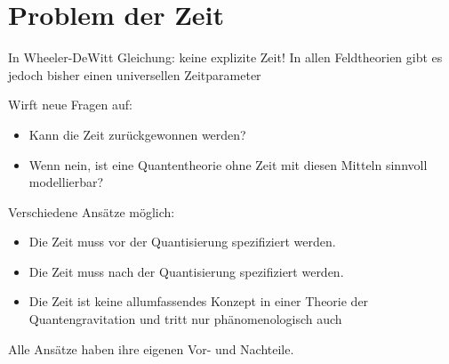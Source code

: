 \documentclass[mathserif]{beamer}
\theoremstyle{definition}
\begin{document}
\section{Problem der Zeit}
	\begin{frame}
		In Wheeler-DeWitt Gleichung: keine explizite Zeit!
		In allen Feldtheorien gibt es jedoch bisher einen universellen Zeitparameter
		\pause
		\begin{center}Wirft neue Fragen auf:\end{center}
		\begin{itemize}
			\item Kann die Zeit zurückgewonnen werden?
			\item Wenn nein, ist eine Quantentheorie ohne Zeit mit diesen Mitteln sinnvoll modellierbar?
		\end{itemize}
	\end{frame}
	\begin{frame}
		Verschiedene Ansätze möglich:
		\begin{itemize}
			\item Die Zeit muss vor der Quantisierung spezifiziert werden.
			\pause
			\item Die Zeit muss nach der Quantisierung spezifiziert werden.
			\pause
			\item Die Zeit ist keine allumfassendes Konzept in einer Theorie der Quantengravitation
				und tritt nur phänomenologisch auch
			\pause
		\end{itemize}
		Alle Ansätze haben ihre eigenen Vor- und Nachteile.
	\end{frame}
\end{document}
